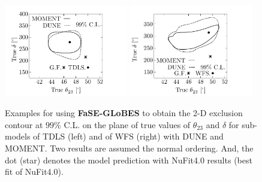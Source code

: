 \documentclass[aps,prd,nofootinbib,preprint]{revtex4}
\begin{document}
\begin{figure}[!h]
 \centering
\includegraphics[width=0.48\textwidth]{Figs/SR_th23_dCP_DUNE_MOMENT.pdf}
\includegraphics[width=0.48\textwidth]{Figs/SR_th23_dCP_WFS.pdf}
\caption{\label{fig:th23_delta}Examples for using \textbf{FaSE-GLoBES} to obtain the 2-D exclusion contour at $99\%$ C.L. on the plane of true values of $\theta_{23}$ and $\delta$ for sub-models of TDLS (left) and of WFS (right) with DUNE and MOMENT. Two results are assumed the normal ordering. And, the dot (star) denotes the model prediction with NuFit4.0 results (best fit of NuFit4.0).}
\end{figure}
\end{document}
